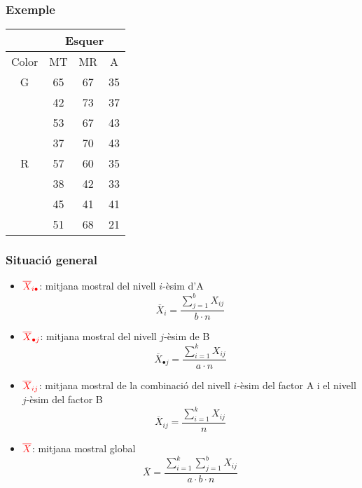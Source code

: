 \documentclass[12pt,t]{beamer}
\newcommand{\red}[1]{\textcolor{red}{#1}}
\theoremstyle{plain}
\theoremstyle{definition}
\begin{document}
\begin{frame}
\frametitle{Exemple} 

\begin{center}
\begin{tabular}{cccc}\hline
\multicolumn{1}{c}{ }&\multicolumn{3}{c}{Esquer}\\\hline
\multicolumn{1}{c}{Color} & \multicolumn{1}{c}{MT}&  \multicolumn{1}{c}{MR} & \multicolumn{1}{c}{A}  \\\hline
G &65 &  67 &  35   \\
&42& 73& 37 \\
& 53  & 67 &  43 \\
&37&  70&   43 \\\hline
R & 57  & 60& 35  \\
 & 38& 42& 33\\
 &45 & 41& 41 \\
 & 51& 68&  21 \\\hline
 \end{tabular}
\end{center}

\end{frame}


\begin{frame}
\frametitle{Situació general} 

\begin{itemize}

\item $\red{\overline{X}_{i\bullet}}$: mitjana mostral del nivell $i$-èsim d'A 
$$
\overline{X}_{i}=\dfrac{\sum_{j=1}^b X_{ij}}{b\cdot n}
$$

\item $\red{\overline{X}_{\bullet j}}$: mitjana mostral del nivell $j$-èsim  de  B 
$$
\overline{X}_{\bullet j}=\dfrac{\sum_{i=1}^k X_{ij}}{a\cdot n}
$$

\item $\red{\overline{X}_{i j}}$: mitjana mostral de la combinació del nivell $i$-èsim del factor A i el nivell $j$-èsim  del factor B 
$$
\overline{X}_{i j}=\dfrac{\sum_{i=1}^k X_{ij}}{n}
$$


\item $\red{\overline{X}}$: mitjana mostral global 
$$
\overline{X}=\dfrac{\sum_{i=1}^k\sum_{j=1}^b X_{ij}}{a\cdot b\cdot n}
$$
\end{itemize}
\end{frame}
\end{document}
